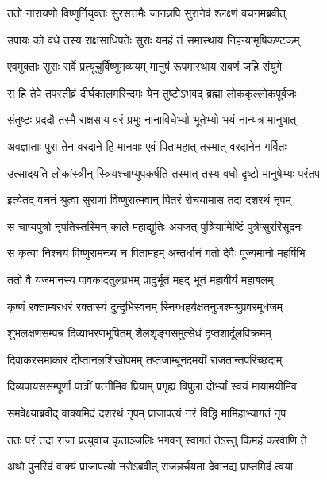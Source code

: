 
\twolineshloka
{ततो नारायणो विष्णुर्नियुक्तः सुरसत्तमैः}
{जानन्नपि सुरानेवं श्लक्ष्णं वचनमब्रवीत्} %

\twolineshloka
{उपायः को वधे तस्य राक्षसाधिपतेः सुराः}
{यमहं तं समास्थाय निहन्यामृषिकण्टकम्} %

\twolineshloka
{एवमुक्ताः सुराः सर्वे प्रत्यूचुर्विष्णुमव्ययम्}
{मानुषं रूपमास्थाय रावणं जहि संयुगे} %

\twolineshloka
{स हि तेपे तपस्तीव्रं दीर्घकालमरिन्दमः}
{येन तुष्टोऽभवद् ब्रह्मा लोककृल्लोकपूर्वजः} %

\twolineshloka
{संतुष्टः प्रददौ तस्मै राक्षसाय वरं प्रभुः}
{नानाविधेभ्यो भूतेभ्यो भयं नान्यत्र मानुषात्} %

\twolineshloka
{अवज्ञाताः पुरा तेन वरदाने हि मानवाः}
{एवं पितामहात् तस्मात् वरदानेन गर्वितः} %

\twolineshloka
{उत्सादयति लोकांस्त्रीन् स्त्रियश्चाप्युपकर्षति}
{तस्मात् तस्य वधो दृष्टो मानुषेभ्यः परंतप} %

\twolineshloka
{इत्येतद् वचनं श्रुत्वा सुराणां विष्णुरात्मवान्}
{पितरं रोचयामास तदा दशरथं नृपम्} %

\twolineshloka
{स चाप्यपुत्रो नृपतिस्तस्मिन् काले महाद्युतिः}
{अयजत् पुत्रियामिष्टिं पुत्रेप्सुररिसूदनः} %

\twolineshloka
{स कृत्वा निश्चयं विष्णुरामन्त्र्य च पितामहम्}
{अन्तर्धानं गतो देवैः पूज्यमानो महर्षिभिः} %

\twolineshloka
{ततो वै यजमानस्य पावकादतुलप्रभम्}
{प्रादुर्भूतं महद् भूतं महावीर्यं महाबलम्} %

\twolineshloka
{कृष्णं रक्ताम्बरधरं रक्तास्यं दुन्दुभिस्वनम्}
{स्निग्धहर्यक्षतनुजश्मश्रुप्रवरमूर्धजम्} %

\twolineshloka
{शुभलक्षणसम्पन्नं दिव्याभरणभूषितम्}
{शैलशृङ्गसमुत्सेधं दृप्तशार्दूलविक्रमम्} %

\twolineshloka
{दिवाकरसमाकारं दीप्तानलशिखोपमम्}
{तप्तजाम्बूनदमयीं राजतान्तपरिच्छदाम्} %

\twolineshloka
{दिव्यपायससम्पूर्णां पात्रीं पत्नीमिव प्रियाम्}
{प्रगृह्य विपुलां दोर्भ्यां स्वयं मायामयीमिव} %

\twolineshloka
{समवेक्ष्याब्रवीद् वाक्यमिदं दशरथं नृपम्}
{प्राजापत्यं नरं विद्धि मामिहाभ्यागतं नृप} %

\twolineshloka
{ततः परं तदा राजा प्रत्युवाच कृताञ्जलिः}
{भगवन् स्वागतं तेऽस्तु किमहं करवाणि ते} %

\twolineshloka
{अथो पुनरिदं वाक्यं प्राजापत्यो नरोऽब्रवीत्}
{राजन्नर्चयता देवानद्य प्राप्तमिदं त्वया} %

